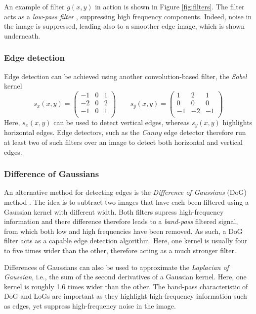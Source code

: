 An example of filter $g(x,y)$ in action is shown in Figure \ref{fig:filters}. The filter acts as a \emph{low-pass filter} , suppressing high frequency components. Indeed, noise in the image is suppressed, leading also to a smoother edge image, which is shown underneath.

\subsubsection{Edge detection}\label{sec:sobel}
Edge detection can be achieved using another convolution-based filter, the \emph{Sobel} kernel
\begin{equation}
s_x(x,y)=
\left(
\begin{array}{ccc}
-1 & 0 & 1\\
-2 & 0 & 2\\
-1 & 0 & 1\\
\end{array}
\right)
\qquad
s_y(x,y)=
\left(
\begin{array}{ccc}
1 & 2 & 1\\
0 & 0 & 0\\
-1 & -2 & -1\\
\end{array}
\right)
\end{equation}
Here, $s_x(x,y)$ can be used to detect vertical edges, whereas $s_y(x,y)$ highlights horizontal edges. Edge detectors, such as the \emph{Canny} edge detector  therefore run at least two of such filters over an image to detect both horizontal and vertical edges.

\subsubsection{Difference of Gaussians}
An alternative method for detecting edges is the \emph{Difference of Gaussians} (DoG) method . The idea is to subtract two images that have each been filtered using a Gaussian kernel with different width. Both filters supress high-frequency information and there difference therefore leads to a \emph{band-pass} filtered signal, from which both low and high frequencies have been removed. As such, a DoG filter acts as a capable edge detection algorithm. Here, one kernel is usually four to five times wider than the other, therefore acting as a much stronger filter.

Differences of Gaussians can also be used to approximate the \emph{Laplacian of Gaussian}, i.e., the sum of the second derivatives of a Gaussian kernel. Here, one kernel is roughly 1.6 times wider than the other. The band-pass characteristic of DoG and LoGs are important as they highlight high-frequency information such as edges, yet suppress high-frequency noise in the image.


